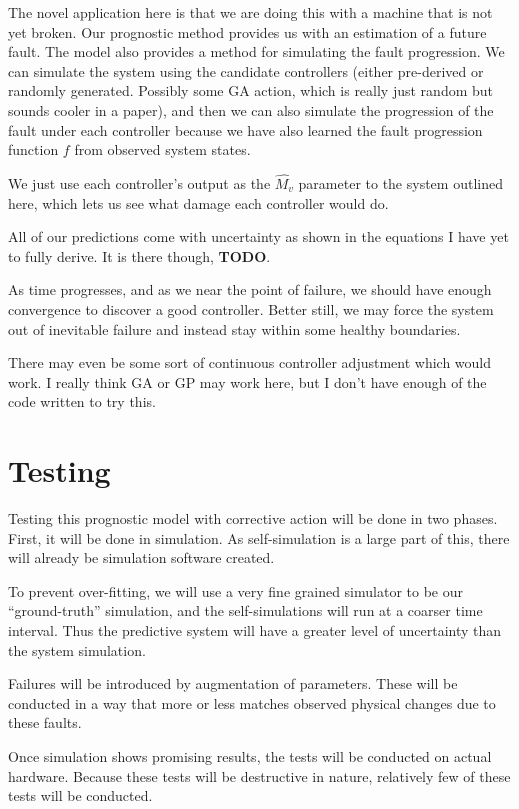 \documentclass[12pt]{article}
\begin{document}
The novel application here is that we are doing this with a machine
that is not yet broken.  Our prognostic method provides us with an
estimation of a future fault.  The model also provides a method for
simulating the fault progression.  We can simulate the system using
the candidate controllers (either pre-derived or randomly generated.
Possibly some GA action, which is really just random but sounds cooler
in a paper), and then we can also simulate the progression of the
fault under each controller because we have also learned the fault
progression function $f$ from observed system states.

We just use each controller's output as the $\hat{M_v}$ parameter to
the system outlined here, which lets us see what damage each
controller would do.

All of our predictions come with uncertainty as shown in the equations
I have yet to fully derive.  It is there though, {\bf TODO}.

As time progresses, and as we near the point of failure, we should
have enough convergence to discover a good controller.  Better still,
we may force the system out of inevitable failure and instead stay
within some healthy boundaries.  

There may even be some sort of continuous controller adjustment which
would work.  I really think GA or GP may work here, but I don't have
enough of the code written to try this.

\section{Testing}
Testing this prognostic model with corrective action will be done in
two phases.  First, it will be done in simulation.  As self-simulation
is a large part of this, there will already be simulation software
created.

To prevent over-fitting, we will use a very fine grained simulator to
be our ``ground-truth'' simulation, and the self-simulations will
run at a coarser time interval.  Thus the predictive system will have
a greater level of uncertainty than the system simulation.

Failures will be introduced by augmentation of parameters.  These will
be conducted in a way that more or less matches observed physical
changes due to these faults.

Once simulation shows promising results, the tests will be conducted
on actual hardware.  Because these tests will be destructive in
nature, relatively few of these tests will be conducted.
\end{document}
